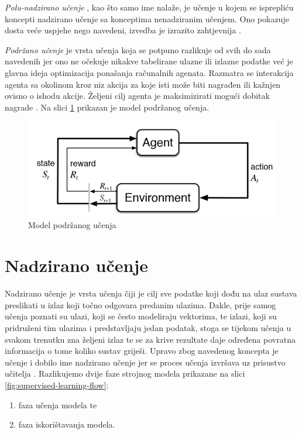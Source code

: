 \documentclass[times, utf8, zavrsni]{fer}
\begin{document}
\bigskip

\textit{Polu-nadzirano učenje} , kao što samo ime nalaže, je učenje u kojem se isprepliću koncepti nadzirano učenje sa konceptima nenadziranim učenjem. Ono pokazuje dosta veće uspjehe nego navedeni, izvedba je izrazito zahtjevnija \citep{wiki:SEMISUP}.

\bigskip

\textit{Podržano učenje}  je vrsta učenja koja se potpuno razlikuje od svih do sada navedenih jer ono ne očekuje nikakve tabelirane ulazne ili izlazne podatke već je glavna ideja optimizacija ponašanja računalnih agenata. Razmatra se interakcija agenta sa okolinom  kroz niz akcija za koje isti može biti nagrađen ili kažnjen ovisno o ishodu akcije. Željeni cilj agenta je maksimizirati mogući dobitak nagrade \citep{wiki:RL}. Na slici \ref{fig:reinforcement-learning} prikazan je model podržanog učenja.

\begin{figure}[H]
    \centering
    \includegraphics[scale=0.7]{img/reinforcement-learning.jpg}
    \caption[Caption for LOF]{Model podržanog učenja\footnotemark}
    \label{fig:reinforcement-learning}
\end{figure}

\chapter{Nadzirano učenje}
Nadzirano učenje  je vrsta učenja čiji je cilj sve podatke koji dođu na ulaz sustava preslikati u izlaz koji točno odgovara predanim ulazima. Dakle, prije samog učenja poznati su ulazi, koji se često modeliraju vektorima, te izlazi, koji su pridruženi tim ulazima i predstavljaju jedan podatak, stoga se tijekom učenja u svakom trenutku zna željeni izlaz te se za krive rezultate daje određena povratna informacija  o tome koliko sustav griješi. Upravo zbog navedenog koncepta je učenje i dobilo ime nadzirano učenje jer se proces učenja izvršava uz prisustvo učitelja . Razlikujemo dvije faze strojnog modela prikazane na slici \ref{fig:supervised-learning-flow}:
\begin{enumerate}
    \item faza učenja modela te
    \item faza iskorištavanja modela.
\end{enumerate}
\end{document}
